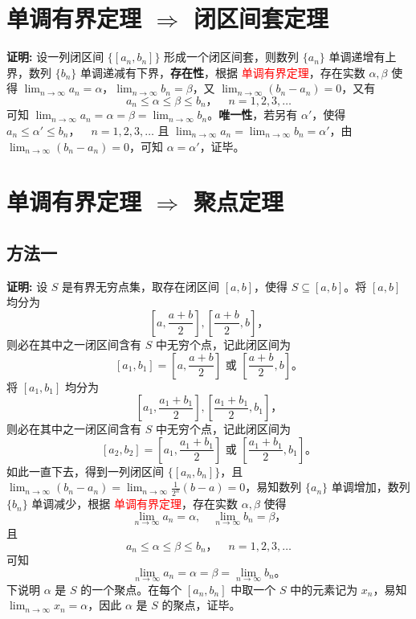 \documentclass[lang=cn,newtx,10pt,scheme=chinese]{elegantbook}
\begin{document}
\section*{单调有界定理 $\Rightarrow$ 闭区间套定理}

\textbf{证明:} 设一列闭区间 $\{[a_n, b_n]\}$ 形成一个闭区间套，则数列 $\{a_n\}$ 单调递增有上界，数列 $\{b_n\}$ 单调递减有下界，\textbf{存在性}，根据 \textcolor{red}{单调有界定理}，存在实数 $\alpha, \beta$ 使得 $\lim_{n \to \infty} a_n = \alpha$，$\lim_{n \to \infty} b_n = \beta$，又 $\lim_{n \to \infty} (b_n - a_n) = 0$，又有
\[
a_n \leq \alpha \leq \beta \leq b_n，\quad n = 1, 2, 3, \ldots
\]
可知 $\lim_{n \to \infty} a_n = \alpha = \beta = \lim_{n \to \infty} b_n$。\textbf{唯一性}，若另有 $\alpha'$，使得 $a_n \leq \alpha' \leq b_n，\quad n = 1, 2, 3, \ldots$ 且 $\lim_{n \to \infty} a_n = \lim_{n \to \infty} b_n = \alpha'$，由 $\lim_{n \to \infty} (b_n - a_n) = 0$，可知 $\alpha = \alpha'$，证毕。




\section*{单调有界定理 $\Rightarrow$ 聚点定理}

\subsection*{方法一}
\textbf{证明:} 设 $S$ 是有界无穷点集，取存在闭区间 $[a, b]$，使得 $S \subseteq [a, b]$。将 $[a, b]$ 均分为
\[
\left[ a, \frac{a + b}{2} \right], \left[ \frac{a + b}{2}, b \right]，
\]
则必在其中之一闭区间含有 $S$ 中无穷个点，记此闭区间为
\[
\left[ a_1, b_1 \right] = \left[ a, \frac{a + b}{2} \right] \text{ 或 } \left[ \frac{a + b}{2}, b \right]。
\]
将 $[a_1, b_1]$ 均分为
\[
\left[ a_1, \frac{a_1 + b_1}{2} \right], \left[ \frac{a_1 + b_1}{2}, b_1 \right]，
\]
则必在其中之一闭区间含有 $S$ 中无穷个点，记此闭区间为
\[
\left[ a_2, b_2 \right] = \left[ a_1, \frac{a_1 + b_1}{2} \right] \text{ 或 } \left[ \frac{a_1 + b_1}{2}, b_1 \right]。
\]
如此一直下去，得到一列闭区间 $\{[a_n, b_n]\}$，且 $\lim_{n \to \infty} (b_n - a_n) = \lim_{n \to \infty} \frac{1}{2^n} (b - a) = 0$，易知数列 $\{a_n\}$ 单调增加，数列 $\{b_n\}$ 单调减少，根据 \textcolor{red}{单调有界定理}，存在实数 $\alpha, \beta$ 使得
\[
\lim_{n \to \infty} a_n = \alpha, \quad \lim_{n \to \infty} b_n = \beta，
\]
且
\[
a_n \leq \alpha \leq \beta \leq b_n， \quad n = 1, 2, 3, \ldots
\]
可知
\[
\lim_{n \to \infty} a_n = \alpha = \beta = \lim_{n \to \infty} b_n。
\]
下说明 $\alpha$ 是 $S$ 的一个聚点。在每个 $[a_n, b_n]$ 中取一个 $S$ 中的元素记为 $x_n$，易知 $\lim_{n \to \infty} x_n = \alpha$，因此 $\alpha$ 是 $S$ 的聚点，证毕。
\end{document}
